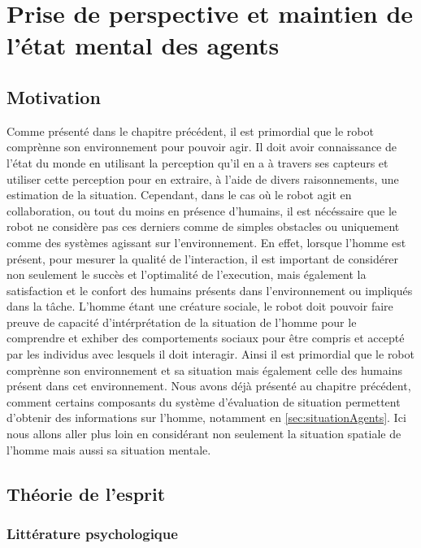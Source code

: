 \documentclass[a4paper,11pt,twoside]{StyleThese}
\begin{document}
\setcounter{chapter}{1} %
\dominitoc
\faketableofcontents
\fi

\chapter{Prise de perspective et maintien de l'état mental des agents}
\label{chapter2}
\minitoc

\section{Motivation}
\label{sec:motivation}
Comme présenté dans le chapitre précédent, il est primordial que le robot comprènne son environnement pour pouvoir agir. Il doit avoir connaissance de l'état du monde en utilisant la perception qu'il en a à travers ses capteurs et utiliser cette perception pour en extraire, à l'aide de divers raisonnements, une estimation de la situation. Cependant, dans le cas où le robot agit en collaboration, ou tout du moins en présence d'humains, il est nécéssaire que le robot ne considère pas ces derniers comme de simples obstacles ou uniquement comme des systèmes agissant sur l'environnement. En effet, lorsque l'homme est présent, pour mesurer la qualité de l'interaction, il est important de considérer non seulement le succès et l'optimalité de l'execution, mais également la satisfaction et le confort des humains présents dans l'environnement ou impliqués dans la tâche. L'homme étant une créature sociale, le robot doit pouvoir faire preuve de capacité d'intérprétation de la situation de l'homme pour le comprendre et exhiber des comportements sociaux pour être compris et accepté par les individus avec lesquels il doit interagir.
Ainsi il est primordial que le robot comprènne son environnement et sa situation mais également celle des humains présent dans cet environnement.
Nous avons déjà présenté au chapitre précédent, comment certains composants du système d'évaluation de situation permettent d'obtenir des informations sur l'homme, notamment en \ref{sec:situationAgents}. Ici nous allons aller plus loin en considérant non seulement la situation spatiale de l'homme mais aussi sa situation mentale.

\section{Théorie de l'esprit}
\subsection{Littérature psychologique}
\label{sec:psy}
\end{document}
